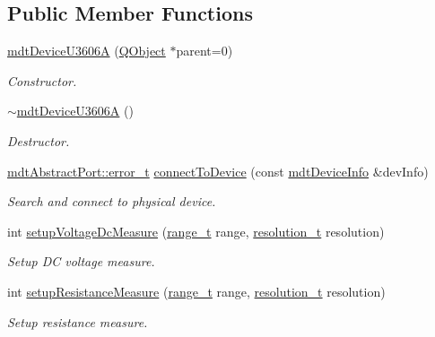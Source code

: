 \subsection*{Public Member Functions}
\begin{DoxyCompactItemize}
\item 
\hyperlink{classmdt_device_u3606_a_a91201ae14df7b553a947b5857eaa1c65}{mdt\-Device\-U3606\-A} (\hyperlink{class_q_object}{Q\-Object} $\ast$parent=0)
\begin{DoxyCompactList}\small\item\em Constructor. \end{DoxyCompactList}\item 
\hyperlink{classmdt_device_u3606_a_a7d2fb26475e72cce95ca6be384d569b7}{$\sim$mdt\-Device\-U3606\-A} ()
\begin{DoxyCompactList}\small\item\em Destructor. \end{DoxyCompactList}\item 
\hyperlink{classmdt_abstract_port_ad4121bb930c95887e77f8bafa065a85e}{mdt\-Abstract\-Port\-::error\-\_\-t} \hyperlink{classmdt_device_u3606_a_acf3b48b13bc179ad4f94b3011b7d607a}{connect\-To\-Device} (const \hyperlink{classmdt_device_info}{mdt\-Device\-Info} \&dev\-Info)
\begin{DoxyCompactList}\small\item\em Search and connect to physical device. \end{DoxyCompactList}\item 
int \hyperlink{classmdt_device_u3606_a_a8337592105ceb3969ebba90e5e0a528d}{setup\-Voltage\-Dc\-Measure} (\hyperlink{classmdt_device_u3606_a_ae05c254d19a66c1728d30100f7c600dc}{range\-\_\-t} range, \hyperlink{classmdt_device_u3606_a_a1899206163f2a0163d09cbc482daf806}{resolution\-\_\-t} resolution)
\begin{DoxyCompactList}\small\item\em Setup D\-C voltage measure. \end{DoxyCompactList}\item 
int \hyperlink{classmdt_device_u3606_a_a3ccd18368d0c1a2641e209a471e5753e}{setup\-Resistance\-Measure} (\hyperlink{classmdt_device_u3606_a_ae05c254d19a66c1728d30100f7c600dc}{range\-\_\-t} range, \hyperlink{classmdt_device_u3606_a_a1899206163f2a0163d09cbc482daf806}{resolution\-\_\-t} resolution)
\begin{DoxyCompactList}\small\item\em Setup resistance measure. \end{DoxyCompactList}\item 

\end{DoxyCompactItemize}
